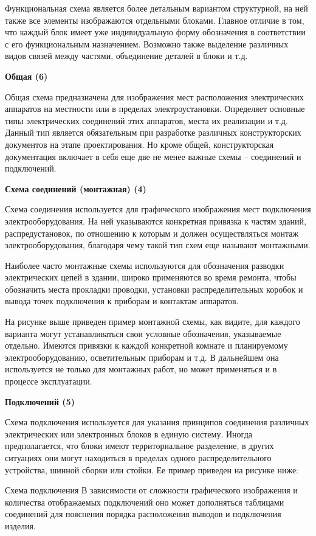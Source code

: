 \documentclass[%
	11pt,
	a4paper,
	utf8,
		]{article}
\begin{document}
Функциональная схема является более детальным вариантом структурной, на ней также все элементы изображаются отдельными блоками. Главное отличие в том, что каждый блок имеет уже индивидуальную форму обозначения в соответствии с  его функциональным назначением. Возможно также выделение различных видов связей между частями, объединение деталей в блоки и т.д.

\textbf{Общая (6)}

Общая схема предназначена для изображения мест расположения электрических аппаратов на местности или в пределах электроустановки. Определяет основные типы электрических соединений этих аппаратов, места их реализации и т.д. Данный тип является обязательным при разработке различных конструкторских документов на этапе проектирования. Но кроме общей, конструкторская документация включает в себя еще две не менее важные схемы – соединений и подключений.

\textbf{Схема соединений (монтажная) (4)}

Схема соединения используется для графического изображения мест подключения электрооборудования. На ней указываются конкретная привязка к частям зданий, распредустановок, по отношению к которым и должен осуществляться монтаж электрооборудования, благодаря чему такой тип схем еще называют монтажными.

Наиболее часто монтажные схемы используются для обозначения разводки электрических цепей в здании, широко применяются во время ремонта, чтобы обозначить места прокладки проводки, установки распределительных коробок и вывода точек подключения к приборам и контактам аппаратов.

На рисунке выше приведен пример монтажной схемы, как видите, для каждого варианта могут устанавливаться свои условные обозначения, указываемые отдельно. Имеются привязки к каждой конкретной комнате и планируемому электрооборудованию, осветительным приборам и т.д. В дальнейшем она используется не только для монтажных работ, но может применяться и в процессе эксплуатации.


\textbf{Подключений (5)}

Схема подключения используется для указания принципов соединения различных электрических или электронных блоков в единую систему. Иногда предполагается, что блоки имеют территориальное разделение, в других ситуациях они могут находиться в пределах одного распределительного устройства, шинной сборки или стойки. Ее пример  приведен на рисунке ниже:

Схема подключения
В зависимости от сложности графического изображения и количества отображаемых подключений оно может дополняться таблицами соединений для пояснения порядка расположения выводов и подключения изделия.
\end{document}
